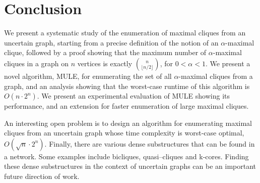 \documentclass[11pt,letterpaper]{article}
\newcommand{\remove}[1]{}
\begin{document}

\remove{
\item From Figure~\ref{fig:2}, we can see that the algorithm runtime
  increases almost linearly with input size for random graphs.
  This comparison was not performed for semi--synthetic or real
  world graphs as they have different underlying structures and
  hence the comparison does not give any meaningful interpretation.
}

%

\section{Conclusion}

We present a systematic study of the enumeration of maximal cliques from an uncertain graph, starting from a precise definition of the notion of an $\alpha$-maximal clique, followed by a proof showing that the maximum number of $\alpha$-maximal cliques in a graph on $n$ vertices is exactly $n \choose \lfloor n/2 \rfloor$, for $0 < \alpha < 1$. We present a novel algorithm, MULE, for enumerating the set of all $\alpha$-maximal cliques from a graph, and an analysis showing that the worst-case runtime of this algorithm is $O \left ( n \cdot 2^n \right)$. We present an experimental evaluation of MULE showing its performance, and an extension for faster enumeration of large maximal cliques.

An interesting open problem is to design an algorithm for enumerating maximal cliques from an uncertain graph whose time complexity is worst-case optimal, $O \left ( \sqrt{n} \cdot 2^n \right)$.
Finally, there are various dense substructures that can be found in a network. Some examples include
bicliques, quasi--cliques and k-cores. Finding these dense substructures in the context of uncertain graphs
can be an important future direction of work.






\end{document}

